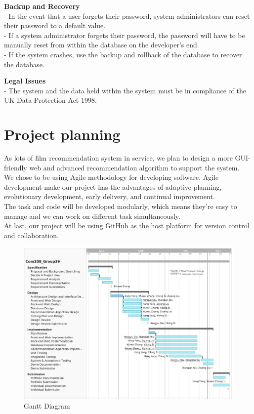 \documentclass[10pt]{article}
\begin{document}
\noindent \textbf{Backup and Recovery\\} 
- In the event that a user forgets their password, system administrators can reset their password to a default value. \\
- If a system administrator forgets their password, the password will have to be 
manually reset from within the database on the developer’s end. \\
- If the system crashes, use the backup and rollback of the database to recover the database.

\noindent \textbf{Legal Issues\\} 
- The system and the data held within the system must be in compliance of the UK Data Protection Act 1998.

\section{Project planning}
As lots of film recommendation system in service, we plan to design a more GUI-friendly web and advanced recommendation algorithm to support the system.\\
We chose to be using Agile methodology for developing software. Agile development make our project has the advantages of adaptive planning, evolutionary development, early delivery, and continual improvement.\\The task and code will be developed modularly, which means they’re easy to manage and we can work on different task simultaneously. \\At last, our project will be using GitHub as the host platform for version control and collaboration.
%
%
\begin{figure}[H]
\centering
\includegraphics[scale =0.26]{GTD.jpg}
\caption{Gantt Diagram}
\label{fig:image}
\end{figure}
\end{document}
